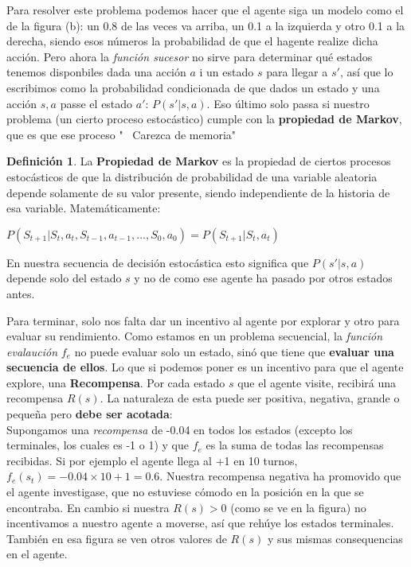 \documentclass[12pt,a4paper,catalan, leqno]{article} %
\theoremstyle{definition}
\newtheorem{defn}{Definición}[section]
\begin{document}
Para resolver este problema podemos hacer que el agente siga un modelo como el de la figura (b): un 0.8 de las veces va arriba, un 0.1 a la izquierda y otro 0.1 a la derecha, siendo esos números la probabilidad de que el hagente realize dicha acción. Pero ahora la \textit{función sucesor} no sirve para determinar qué estados tenemos disponbiles dada una acción $a$ i un estado $s$ para llegar a $s'$, así que lo escribimos como la probabilidad condicionada de que dados un estado y una acción $s, a$ passe el estado $a'$: $P(s'|s,a)$. Eso último solo passa si nuestro problema (un cierto proceso estocástico) cumple con la \textbf{propiedad de Markov}, que es que ese proceso " \ Carezca de memoria"

\begin{defn}
La \textbf{Propiedad de Markov} es la propiedad de ciertos procesos estocásticos de que la distribución de probabilidad de una variable aleatoria depende solamente de su valor presente, siendo independiente de la historia de esa variable. Matemáticamente:
\begin{center}
    $P(S_{t+1}|S_t,a_t,S_{t-1},a_{t-1},...,S_0,a_0) = P(S_{t+1}|S_t,a_t)$
\end{center}
\end{defn}

En nuestra secuencia de decisión estocástica esto significa que $P(s'|s,a)$ depende solo del estado $s$ y no de como ese agente ha pasado por otros estados antes.

Para terminar, solo nos falta dar un incentivo al agente por explorar y otro para evaluar su rendimiento. Como estamos en un problema secuencial, la \textit{función evalaución} $f_e$ no puede evaluar solo un estado, sinó que tiene que \textbf{evaluar una secuencia de ellos}. Lo que si podemos poner es un incentivo para que el agente explore, una \textbf{Recompensa}. Por cada estado $s$ que el agente visite, recibirá una recompensa $R(s)$. La naturaleza de esta puede ser positiva, negativa, grande o pequeña pero \textbf{debe ser acotada}:\\
Supongamos una \textit{recompensa} de -0.04 en todos los estados (excepto los terminales, los cuales es -1 o 1) y que $f_e$ es la suma de todas las recompensas recibidas. Si por ejemplo el agente llega al +1 en 10 turnos, $f_e(s_t) = -0.04 \times 10 + 1 = 0.6$. Nuestra recompensa negativa ha promovido que el agente investigase, que no estuviese cómodo en la posición en la que se encontraba. En cambio si nuestra $R(s) > 0$ (como se ve en la figura) no incentivamos a nuestro agente a moverse, así que rehúye los estados terminales. También en esa figura se ven otros valores de $R(s)$ y sus mismas consequencias en el agente.
\end{document}
